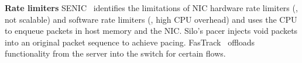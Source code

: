 {\bf Rate limiters}
SENIC~\cite{niranjan2013fastrak}
identifies the limitations of NIC hardware rate limiters (\ie{}, not scalable) and
software rate limiters (\ie{}, high CPU overhead) and uses the CPU to enqueue packets
in host memory and the NIC. Silo's pacer injects void packets into
an original packet sequence to achieve pacing. FasTrack~\cite{niranjan2013fastrak} offloads
functionality from the server into the switch for certain flows.

